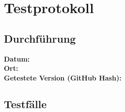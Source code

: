 \chapter{Testprotokoll}
\label{chap:Testprotokoll}

\section{Durchführung}
\textbf{Datum:} \\
\textbf{Ort:} \\
\textbf{Getestete Version (GitHub Hash):} \\

\section{Testfälle}

